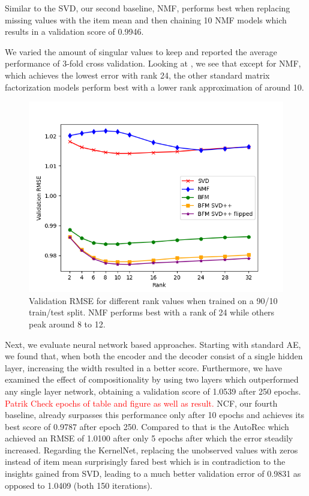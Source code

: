 \documentclass[10pt,conference,compsocconf]{IEEEtran}
\newcommand{\todo}[1]{\textcolor{red}{#1}}
\begin{document}


    Similar to the SVD, our second baseline, NMF, performs best when replacing missing values with the item mean and then chaining 10 NMF models which results in a validation score of 0.9946.

    We varied the amount of singular values to keep and reported the average performance of 3-fold cross validation.
    Looking at , we see that except for NMF, which achieves the lowest error with rank 24, the other standard matrix factorization models perform best with a lower rank approximation of around 10.
    \begin{figure}
        \includegraphics[width=\columnwidth]{figures/rank.png}
        \caption{Validation RMSE for different rank values when trained on a 90/10 train/test split.
        NMF performs best with a rank of 24 while others peak around 8 to 12.}
        \label{fig:rank}
    \end{figure}

    Next, we evaluate neural network based approaches.
    Starting with standard AE, we found that, when both the encoder and the decoder consist of a single hidden layer, increasing the width resulted in a better score.
    Furthermore, we have examined the effect of compositionality by using two layers which outperformed any single layer network, obtaining a validation score of 1.0539 after 250 epochs.
    \todo{Patrik Check epochs of table and figure as well as result.}
    NCF, our fourth baseline, already surpasses this performance only after 10 epochs and achieves its best score of 0.9787 after epoch 250.
    Compared to that is the AutoRec which achieved an RMSE of 1.0100 after only 5 epochs after which the error steadily increased.
    Regarding the KernelNet, replacing the unobserved values with zeros instead of item mean surprisingly fared best which is in contradiction to the insights gained from SVD, leading to a much better validation error of 0.9831 as opposed to 1.0409 (both 150 iterations).
\end{document}
